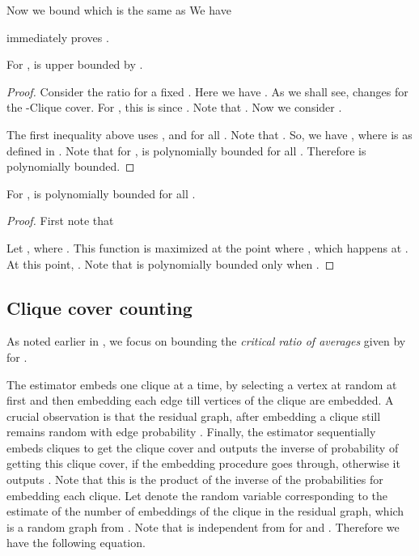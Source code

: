 \documentclass[runningheads,a4paper]{llncs}
\newcounter{obs}
\begin{document}
Now we bound  which is the same as 
We have


 immediately proves .

\begin{lemma}\label{lem:app-clique}
For ,   is upper bounded by .
\end{lemma}

\begin{proof}
Consider the ratio  for a fixed . Here we have . As we shall see,  changes for the -Clique cover. For , this is  since . Note that 
. Now we consider .

The first inequality above uses ,  and  for all . Note that . So, we have 
, where  is as defined in . Note that for ,  
is polynomially bounded for all . Therefore  is polynomially bounded.
\end{proof}

\begin{lemma}\label{lem:app-poly}
For ,  is polynomially bounded for all .
\end{lemma}
\begin{proof}
First note that 

Let , where . This function is maximized at the point where , which happens at
. At this point, . Note that  is polynomially bounded only when .

\end{proof}


\subsection{Clique cover counting}\label{sec:app-ccover}
As noted earlier in , we focus on bounding the  {\em critical ratio of averages} given by  for . 

The estimator embeds one clique at a time, by selecting a vertex at random at first and then embedding each edge till  vertices of the clique are embedded. A crucial observation is that the residual graph, after embedding a clique still remains random with edge probability . 
Finally, the estimator sequentially embeds  cliques to get the clique cover and outputs the inverse of probability of getting this clique cover, if the embedding procedure goes through, otherwise it outputs . Note that this is the product of the inverse of the probabilities for embedding each clique. 
Let  denote the random variable corresponding to the estimate of the number of embeddings of the  clique in the residual graph, which is a random graph from . Note that  is independent from  for  and .
Therefore we have the following equation.
\end{document}
